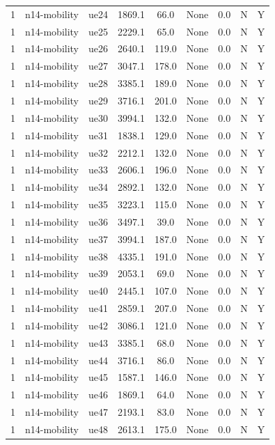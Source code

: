 \begin{table}[ht]
\begin{tabular}{|c|c|c|c|c|c|c|c|c|}
1 & n14-mobility & ue24 & 1869.1 & 66.0 & None & 0.0 & N & Y \\
1 & n14-mobility & ue25 & 2229.1 & 65.0 & None & 0.0 & N & Y \\
1 & n14-mobility & ue26 & 2640.1 & 119.0 & None & 0.0 & N & Y \\
1 & n14-mobility & ue27 & 3047.1 & 178.0 & None & 0.0 & N & Y \\
1 & n14-mobility & ue28 & 3385.1 & 189.0 & None & 0.0 & N & Y \\
1 & n14-mobility & ue29 & 3716.1 & 201.0 & None & 0.0 & N & Y \\
1 & n14-mobility & ue30 & 3994.1 & 132.0 & None & 0.0 & N & Y \\
1 & n14-mobility & ue31 & 1838.1 & 129.0 & None & 0.0 & N & Y \\
1 & n14-mobility & ue32 & 2212.1 & 132.0 & None & 0.0 & N & Y \\
1 & n14-mobility & ue33 & 2606.1 & 196.0 & None & 0.0 & N & Y \\
1 & n14-mobility & ue34 & 2892.1 & 132.0 & None & 0.0 & N & Y \\
1 & n14-mobility & ue35 & 3223.1 & 115.0 & None & 0.0 & N & Y \\
1 & n14-mobility & ue36 & 3497.1 & 39.0 & None & 0.0 & N & Y \\
1 & n14-mobility & ue37 & 3994.1 & 187.0 & None & 0.0 & N & Y \\
1 & n14-mobility & ue38 & 4335.1 & 191.0 & None & 0.0 & N & Y \\
1 & n14-mobility & ue39 & 2053.1 & 69.0 & None & 0.0 & N & Y \\
1 & n14-mobility & ue40 & 2445.1 & 107.0 & None & 0.0 & N & Y \\
1 & n14-mobility & ue41 & 2859.1 & 207.0 & None & 0.0 & N & Y \\
1 & n14-mobility & ue42 & 3086.1 & 121.0 & None & 0.0 & N & Y \\
1 & n14-mobility & ue43 & 3385.1 & 68.0 & None & 0.0 & N & Y \\
1 & n14-mobility & ue44 & 3716.1 & 86.0 & None & 0.0 & N & Y \\
1 & n14-mobility & ue45 & 1587.1 & 146.0 & None & 0.0 & N & Y \\
1 & n14-mobility & ue46 & 1869.1 & 64.0 & None & 0.0 & N & Y \\
1 & n14-mobility & ue47 & 2193.1 & 83.0 & None & 0.0 & N & Y \\
1 & n14-mobility & ue48 & 2613.1 & 175.0 & None & 0.0 & N & Y \\

\end{tabular}
\end{table}
